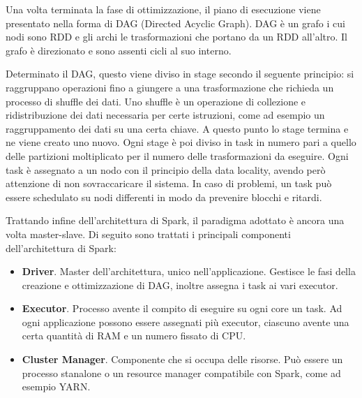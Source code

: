 Una volta terminata la fase di ottimizzazione, il piano di esecuzione viene presentato nella forma di DAG (Directed Acyclic Graph).
DAG è un grafo i cui nodi sono RDD e gli archi le trasformazioni che portano da un RDD all'altro.
Il grafo è direzionato e sono assenti cicli al suo interno.

Determinato il DAG, questo viene diviso in stage secondo il seguente principio: si raggruppano operazioni fino a giungere a una trasformazione che richieda un processo di shuffle dei dati.
Uno shuffle è un operazione di collezione e ridistribuzione dei dati necessaria per certe istruzioni, come ad esempio un raggruppamento dei dati su una certa chiave.
A questo punto lo stage termina e ne viene creato uno nuovo.
Ogni stage è poi diviso in task in numero pari a quello delle partizioni moltiplicato per il numero delle trasformazioni da eseguire.
Ogni task è assegnato a un nodo con il principio della data locality, avendo però attenzione di non sovraccaricare il sistema.
In caso di problemi, un task può essere schedulato su nodi differenti in modo da prevenire blocchi e ritardi.

Trattando infine dell'architettura di Spark, il paradigma adottato è ancora una volta master-slave.
Di seguito sono trattati i principali componenti dell'architettura di Spark:

\begin{itemize}
    \item \textbf{Driver}.
    Master dell'architettura, unico nell'applicazione. 
    Gestisce le fasi della creazione e ottimizzazione di DAG, inoltre assegna i task ai vari executor.
    
    \item \textbf{Executor}.
    Processo avente il compito di eseguire su ogni core un task.
    Ad ogni applicazione possono essere assegnati più executor, ciascuno avente una certa quantità di RAM e un numero fissato di CPU.
    
    \item \textbf{Cluster Manager}.
    Componente che si occupa delle risorse.
    Può essere un processo stanalone o un resource manager compatibile con Spark, come ad esempio YARN.
\end{itemize}